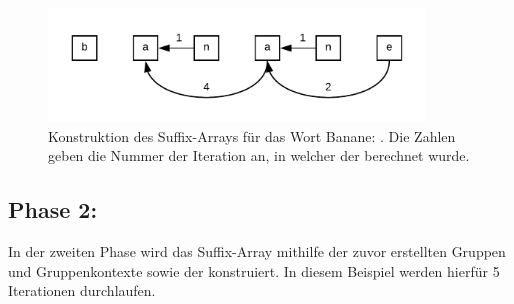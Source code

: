 

\newpage 		%



\begin{figure}[!b]
	\begin{minipage}[H]{10cm}
		\centering
		\includegraphics[width=10cm]{kapitel/saca_algorithmen/gsaca/images/Banane-prev-pointer}
	\end{minipage}
	\caption[Konstruktion des Suffix-Arrays für das Wort Banane: \prevpointer]{Konstruktion des Suffix-Arrays für das Wort Banane: \prevpointer. Die Zahlen geben die Nummer der Iteration an, in welcher der \prevpointer berechnet wurde.}
\label{fig_banane_prev_pointer}
\end{figure}
\newpage		%
\newpage		%
\newpage		%

\subsection*{Phase 2:}
In der zweiten Phase wird das Suffix-Array mithilfe der zuvor erstellten Gruppen und Gruppenkontexte sowie der \prevpointer konstruiert. 
In diesem Beispiel werden hierfür 5 Iterationen durchlaufen.\\

